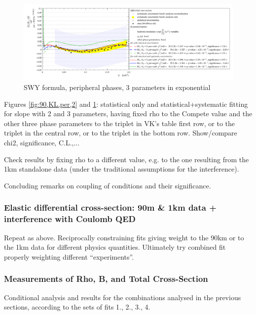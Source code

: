 \begin{figure}
\begin{center}
\includegraphics[width=18cm]{simone/90/KL,per-var048,3,stat-stat+syst.pdf}
\vskip-3mm
\caption{SWY formula, peripheral phases, 3 parameters in exponential}
\label{fig:90,KL,per,3}
\end{center}
\end{figure}

Figures \ref{fig:90,KL,per,2} and \ref{fig:90,KL,per,3}:
statistical only and statistical+systematic fitting for slope with 2 and 3 parameters,
having fixed rho to the Compete value and the other three phase parameters to the triplet
in VK’s table first row, or to the triplet in the central row, or to the triplet in the
bottom row. Show/compare chi2, significance, C.L.,...

Check results by fixing rho to a different value, e.g. to the one resulting from the 1km
standalone data (under the traditional assumptions for the interference).

Concluding remarks on coupling of conditions and their significance.


\subsubsection{Elastic differential cross-section: 90m \& 1km data + interference with Coulomb QED}

Repeat as above. Reciprocally constraining fits giving weight to the 90km or to the 1km data
for different physics quantities. Ultimately try combined fit properly weighting different
“experiments”.


\subsubsection{Measurements of Rho, B, and Total Cross-Section}

Conditional analysis and results for the combinations analysed in the previous sections,
according to the sets of fits 1., 2., 3., 4.
